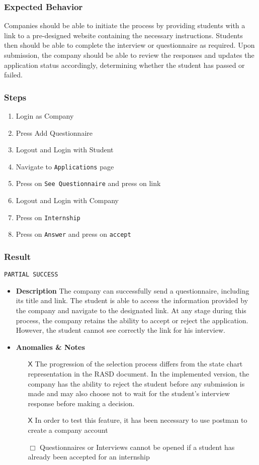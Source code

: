 \subsubsection{Expected Behavior}
Companies should be able to initiate the process by providing students with a link to a pre-designed website containing the necessary instructions. Students then should be able to complete the interview or questionnaire as required. Upon submission, the company should be able to review the responses and updates the application status accordingly, determining whether the student has passed or failed.
\subsubsection{Steps}
\begin{enumerate}
    \item Login as Company
    \item Press Add Questionnaire
    \item Logout and Login with Student
    \item Navigate to \verb|Applications| page
    \item Press on \verb|See Questionnaire| and press on link
    \item Logout and Login with Company
    \item Press on \verb|Internship|
    \item Press on \verb|Answer| and press on \verb|accept|
\end{enumerate}
\subsubsection{Result}
\verb|PARTIAL SUCCESS|
\begin{itemize}
    \item \textbf{\color{titleColor} Description}
    The company can successfully send a questionnaire, including its title and link. The student is able to access the information provided by the company and navigate to the designated link. At any stage during this process, the company retains the ability to accept or reject the application. However, the student cannot see correctly the link for his interview.
    \item \textbf{\color{titleColor} Anomalies \& Notes}
    \begin{itemize}
        \item [{\color{titleColor}\(\mathsf{X}\)}] The progression of the selection process differs from the state chart representation in the RASD document. In the implemented version, the company has the ability to reject the student before any submission is made and may also choose not to wait for the student's interview response before making a decision.
        \item [{\color{titleColor}\(\mathsf{X}\)}] In order to test this feature, it has been necessary to use postman to create a company account
        \item [{\color{titleColor}\(\Box \)}] Questionnaires or Interviews cannot be opened if a student has already been accepted for an internship 
    \end{itemize} 
\end{itemize}
